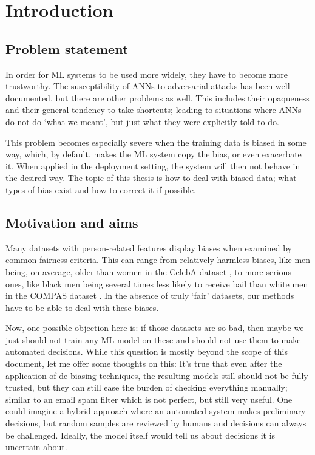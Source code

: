 \chapter{Introduction}\label{ch:introduction}
\section{Problem statement}
In order for \ac{ML} systems to be used more widely,
they have to become more trustworthy.
The susceptibility of \acp{ANN} to adversarial attacks has been well documented, but there are other problems as well.
This includes their opaqueness and their general tendency to take shortcuts;
leading to situations where \acp{ANN} do not do `what we meant', but just what they were explicitly told to do.

This problem becomes especially severe when the training data is biased in some way,
which, by default, makes the \ac{ML} system copy the bias, or even exacerbate it.
When applied in the deployment setting, the system will then not behave in the desired way.
The topic of this thesis is how to deal with biased data;
what types of bias exist and how to correct it if possible.

\section{Motivation and aims}
Many datasets with person-related features display biases when examined by common fairness criteria.
This can range from relatively harmless biases,
like men being, on average, older than women in the CelebA dataset \citep{liu2015faceattributes},
to more serious ones,
like black men being several times less likely to receive bail than white men in the COMPAS dataset \citep{angwin2016machine}.
In the absence of truly `fair' datasets, our methods have to be able to deal with these biases.

Now, one possible objection here is:
if those datasets are so bad,
then maybe we just should not train any \ac{ML} model on these and should not use them to make automated decisions.
While this question is mostly beyond the scope of this document, let me offer some thoughts on this:
It's true that even after the application of de-biasing techniques,
the resulting models still should not be fully trusted,
but they can still ease the burden of checking everything manually;
similar to an email spam filter which is not perfect, but still very useful.
One could imagine a hybrid approach where an automated system makes preliminary decisions,
but random samples are reviewed by humans and decisions can always be challenged.
Ideally, the model itself would tell us about decisions it is uncertain about.

